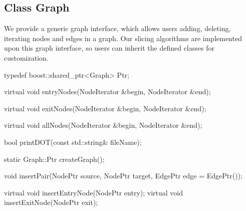 \subsection{Class Graph}
\label{sec:graph}

We provide a generic graph interface, which allows users adding, deleting,
iterating nodes and edges in a graph. Our slicing algorithms are implemented
upon this graph interface, so users can inherit the defined classes for
customization.

\begin{apient}
typedef boost::shared_ptr<Graph> Ptr;
\end{apient}

\begin{apient}
virtual void entryNodes(NodeIterator &begin, NodeIterator &end);
\end{apient}

\begin{apient}
virtual void exitNodes(NodeIterator &begin, NodeIterator &end);
\end{apient}
    
\begin{apient}
virtual void allNodes(NodeIterator &begin, NodeIterator &end);
\end{apient}

\begin{apient}
bool printDOT(const std::string& fileName);
\end{apient}

\begin{apient}
static Graph::Ptr createGraph();
\end{apient}

\begin{apient}
void insertPair(NodePtr source, NodePtr target, EdgePtr edge = EdgePtr());
\end{apient}

\begin{apient}
virtual void insertEntryNode(NodePtr entry);
virtual void insertExitNode(NodePtr exit);
\end{apient}

